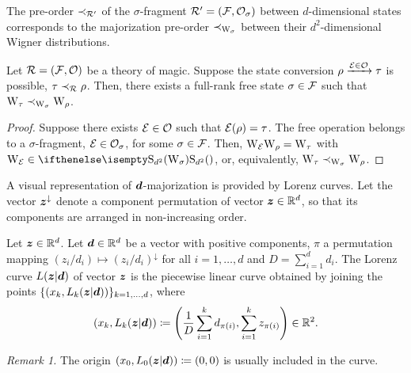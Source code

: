 \documentclass[pra,
aps,
twocolumn,
superscriptaddress,
groupedaddress,
nofootinbib,
reprint
]{revtex4-1}
\begin{document}

The pre-order $\prec_{\mathcal{R}'}$ of the $\sigma$-fragment $\mathcal{R}' = (\mathcal{F}, \mathcal{O}_\sigma)$ between $d$-dimensional states corresponds to the majorization pre-order $\prec_{\W{\sigma}}$ between their $d^2$-dimensional Wigner distributions.

\begin{theorem}
    Let $\mathcal{R} = (\mathcal{F}, \mathcal{O})$ be a theory of magic.
    Suppose the state conversion $\rho \xrightarrow{\mathcal{E} \in \mathcal{O}} \tau$ is possible, $\tau \prec_{\mathcal{R}} \rho$.
    Then, there exists a full-rank free state $\sigma \in \mathcal{F}$ such that  $\W{\tau} \prec_{\W{\sigma}} \W{\rho}$.
\end{theorem}
\begin{proof}
    Suppose there exists $\mathcal{E} \in \mathcal{O}$ such that $\mathcal{E}(\rho) = \tau$.
    The free operation belongs to a $\sigma$-fragment, $\mathcal{E} \in \mathcal{O}_\sigma$, for some $\sigma \in \mathcal{F}$.
    Then, $\W{\E}\W{\rho} = \W{\tau}$ with $\W{\E} \in \stochw$, or, equivalently, $\W{\tau} \prec_{\W{\sigma}} \W{\rho}$.
\end{proof}

A visual representation of $\bm{d}$-majorization is provided by Lorenz curves.
Let the vector $\bm{z}^\downarrow$ denote a component permutation of vector $\bm{z} \in \mathbb{R}^d$, so that its components are arranged in non-increasing order.
\begin{definition}
    Let $\bm{z} \in \mathbb{R}^d$.
    Let $\bm{d} \in \mathbb{R}^d$ be a vector with positive components, $\pi$ a permutation mapping $(z_i/d_i) \mapsto (z_i/d_i)^\downarrow$ for all $i=1,\dots,d$ and $D = \sum_{i=1}^d d_i$.
    The Lorenz curve $L(\bm{z}|\bm{d})$ of vector $\bm{z}$ is the piecewise linear curve obtained by joining the points $\{ (x_k, L_k(\bm{z}|\bm{d})) \}_{k=1,\dots,d}$, where
    \begin{equation}\label{eq:lorenz}
        (x_k, L_k(\bm{z}|\bm{d})) \coloneqq \left( \frac{1}{D}\sum_{i=1}^k d_{\pi(i)}, \sum_{i=1}^k z_{\pi(i)} \right) \in \mathbb{R}^2.
    \end{equation}
\end{definition}
\emph{Remark 1.} The origin $(x_0, L_0(\bm{z}|\bm{d})) \coloneqq (0,0)$ is usually included in the curve.
\end{document}
